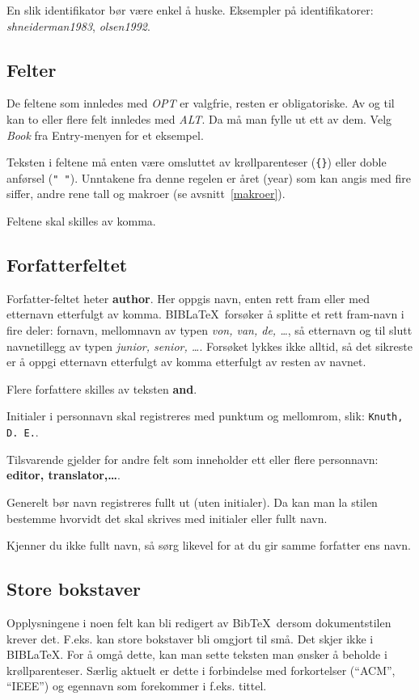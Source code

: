 \documentclass[11pt,norsk,a4paper]{article}
\newcommand{\bt}{BibTeX{}}
\newcommand{\blt}{B{\smaller[2]IB}\discretionary{-}{}{\kern
    -0.12em}\LaTeX{}}
\begin{document}
En slik identifikator bør være enkel å huske. Eksempler på identifikatorer: \textit{shneiderman1983},
\textit{olsen1992}.  

\subsection*{Felter}
De feltene som innledes
med \textit{OPT} er valgfrie, resten er obligatoriske. Av og til kan
to eller flere felt innledes med \textit{ALT}. Da må man fylle ut ett
av dem. Velg \textit{Book} fra Entry-menyen for et eksempel.

Teksten i feltene må enten være omsluttet av krøllparenteser
(\verb={}=) eller doble anførsel (\verb=" "=). Unntakene fra
denne regelen er året (year) som kan angis med fire siffer, andre rene tall og
makroer (se avsnitt~\ref{makroer}).

Feltene skal skilles av komma.

\subsection*{Forfatterfeltet}
Forfatter-feltet heter \textbf{author}. Her oppgis navn, enten rett
fram eller med etternavn etterfulgt av komma. \blt\ forsøker å splitte
et rett fram-navn i fire deler: fornavn, mellomnavn av typen \textit{von, van,
  de, \ldots}, så etternavn og til slutt navnetillegg av typen
\textit{junior, senior, \ldots}. Forsøket lykkes ikke alltid, så det
sikreste er å oppgi etternavn etterfulgt av komma etterfulgt av resten
av navnet.

Flere forfattere skilles av teksten
\textbf{and}.

Initialer i personnavn skal registreres med punktum og mellomrom,
slik: \texttt{Knuth, D. E.}.

Tilsvarende gjelder for andre felt som inneholder ett eller flere
personnavn: \textbf{editor, translator,\ldots}.

Generelt bør navn registreres fullt ut (uten initialer). Da kan man la
stilen bestemme hvorvidt det skal skrives med initialer eller fullt navn.

Kjenner du ikke fullt navn, så sørg likevel for at du gir samme forfatter ens navn.

\subsection*{Store bokstaver }
Opplysningene i noen felt kan bli redigert av \bt\ dersom dokumentstilen krever
det. F.eks. kan store bokstaver bli omgjort til små. Det skjer ikke i \blt. For å omgå dette,
kan man sette teksten man ønsker å beholde i krøllparenteser. Særlig
aktuelt er dette i forbindelse med forkortelser (``ACM'', ``IEEE'') og
egennavn som forekommer i f.eks. tittel. 
\end{document}
